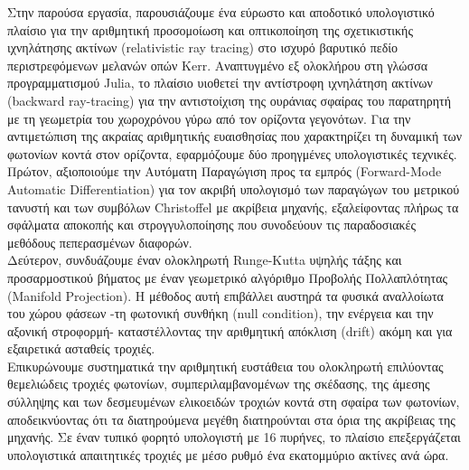 \documentclass[11pt]{book}
\begin{document}
Στην παρούσα εργασία, παρουσιάζουμε ένα εύρωστο και αποδοτικό υπολογιστικό πλαίσιο για την αριθμητική προσομοίωση και οπτικοποίηση της σχετικιστικής ιχνηλάτησης ακτίνων (relativistic ray tracing) στο ισχυρό βαρυτικό πεδίο περιστρεφόμενων μελανών οπών Kerr. Αναπτυγμένο εξ ολοκλήρου στη γλώσσα προγραμματισμού Julia, το πλαίσιο υιοθετεί την αντίστροφη ιχνηλάτηση ακτίνων (backward ray-tracing) για την αντιστοίχιση της ουράνιας σφαίρας του παρατηρητή με τη γεωμετρία του χωροχρόνου γύρω από τον ορίζοντα γεγονότων. Για την αντιμετώπιση της ακραίας αριθμητικής ευαισθησίας που χαρακτηρίζει τη δυναμική των φωτονίων κοντά στον ορίζοντα, εφαρμόζουμε δύο προηγμένες υπολογιστικές τεχνικές.\\
Πρώτον, αξιοποιούμε την Αυτόματη Παραγώγιση προς τα εμπρός (Forward-Mode Automatic Differentiation) για τον ακριβή υπολογισμό των παραγώγων του μετρικού τανυστή και των συμβόλων Christoffel με ακρίβεια μηχανής, εξαλείφοντας πλήρως τα σφάλματα αποκοπής και στρογγυλοποίησης που συνοδεύουν τις παραδοσιακές μεθόδους πεπερασμένων διαφορών.\\
Δεύτερον, συνδυάζουμε έναν ολοκληρωτή Runge-Kutta υψηλής τάξης και προσαρμοστικού βήματος με έναν γεωμετρικό αλγόριθμο Προβολής Πολλαπλότητας (Manifold Projection). Η μέθοδος αυτή επιβάλλει αυστηρά τα φυσικά αναλλοίωτα του χώρου φάσεων -τη φωτονική συνθήκη (null condition), την ενέργεια και την αξονική στροφορμή- καταστέλλοντας την αριθμητική απόκλιση (drift) ακόμη και για εξαιρετικά ασταθείς τροχιές.\\
Επικυρώνουμε συστηματικά την αριθμητική ευστάθεια του ολοκληρωτή επιλύοντας θεμελιώδεις τροχιές φωτονίων, συμπεριλαμβανομένων της σκέδασης, της άμεσης σύλληψης και των δεσμευμένων ελικοειδών τροχιών κοντά στη σφαίρα των φωτονίων, αποδεικνύοντας ότι τα διατηρούμενα μεγέθη διατηρούνται στα όρια της ακρίβειας της μηχανής. Σε έναν τυπικό φορητό υπολογιστή με 16 πυρήνες, το πλαίσιο επεξεργάζεται υπολογιστικά απαιτητικές τροχιές με μέσο ρυθμό ένα εκατομμύριο ακτίνες ανά ώρα.\\
\end{document}
